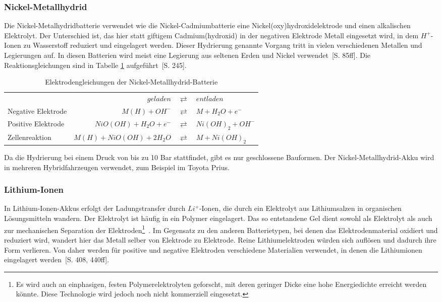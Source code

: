 \subsubsection{Nickel-Metallhydrid}
Die Nickel-Metalhydridbatterie verwendet wie die Nickel-Cadmiumbatterie eine Nickel(oxy)hydroxidelektrode und einen alkalischen Elektrolyt. Der Unterschied ist, das hier statt giftigem Cadmium(hydroxid) in der negativen Elektrode Metall eingesetzt wird, in dem $H^+$-Ionen zu Wasserstoff reduziert und eingelagert werden. Dieser Hydrierung genannte Vorgang tritt in vielen verschiedenen Metallen und Legierungen auf. In diesen Batterien wird meist eine Legierung aus seltenen Erden und Nickel verwendet~\cite{KiehneBattery}[S. 85ff]. Die Reaktionsgleichungen sind in Tabelle \ref{NiMH} aufgeführt~\cite{Sterner:2014}[S. 245].

\begin{table}\centering %
	\begin{tabularx}{\linewidth}{XrcX}
		\toprule
		&              $geladen$ & $\rightleftarrows$ & $entladen$        \\
		Negative Elektrode &          $M(H) + OH^-$ & $\rightleftarrows$ & $M + H_2O + e^-$  \\
		Positive Elektrode &   $NiO(OH) + H_2O + e^-$ & $\rightleftarrows$ & $Ni(OH)_2 + OH^-$ \\ \midrule
		Zellenreaktion     & $M(H) + NiO(OH) + 2H_2O$ & $\rightleftarrows$ & $M + Ni(OH)_2$    \\ \bottomrule
	\end{tabularx}
	\caption{Elektrodengleichungen der Nickel-Metallhydrid-Batterie}
	\label{NiMH}
\end{table}

Da die Hydrierung bei einem Druck von bis zu 10 Bar stattfindet, gibt es nur geschlossene Bauformen. Der Nickel-Metallhydrid-Akku wird in mehreren Hybridfahrzeugen verwendet, zum Beispiel im Toyota Prius. 

\subsubsection{Lithium-Ionen}
In Lithium-Ionen-Akkus erfolgt der Ladungstransfer durch $Li^+$-Ionen, die durch ein Elektrolyt aus Lithiumsalzen in organischen Lösungsmitteln wandern. Der Elektrolyt ist häufig in ein Polymer eingelagert. Das so entstandene Gel dient sowohl als Elektrolyt als auch zur mechanischen Separation der Elektroden\footnote{Es wird auch an einphasigen, festen Polymerelektrolyten geforscht, mit deren geringer Dicke eine hohe Energiedichte erreicht werden könnte. Diese Technologie wird jedoch noch nicht kommerziell eingesetzt.}~\cite{xu2004nonaqueous}. Im Gegensatz zu den anderen Batterietypen, bei denen das Elektrodenmaterial oxidiert und reduziert wird, wandert hier das Metall selber von Elektrode zu Elektrode. Reine Lithiumelektroden würden sich auflösen und dadurch ihre Form verlieren. Von daher werden für positive und negative Elektroden verschiedene Materialien verwendet, in denen die Lithiumionen eingelagert werden~\cite{KiehneBattery}[S. 408, 440ff]. 

